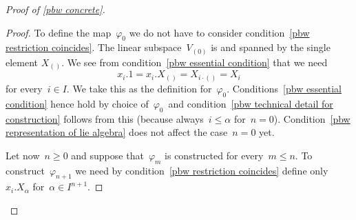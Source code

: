 \begin{proof}[Proof of \cref{pbw concrete}]
\begin{proof}
    To define the map~$\varphi_0$ we do not have to consider condition~\ref*{pbw restriction coincides}.
    The linear subspace~$V_{(0)}$ is {\onedimensional} and spanned by the single element $X_{()}$.
    We see from condition~\ref*{pbw essential condition} that we need
    \[
      x_i.1
      =
      x_i.X_{()}
      =
      X_{i \cdot ()}
      =
      X_i
    \]
    for every~$i \in I$.
    We take this as the definition for~$\varphi_0$.
    Conditions~\ref*{pbw essential condition} hence hold by choice of~$\varphi_0$~and condition~\ref*{pbw technical detail for construction} follows from this (because always~$i \leq \alpha$ for~$n = 0$).
    Condition~\ref*{pbw representation of lie algebra} does not affect the case~$n = 0$ yet.
  
    Let now~$n \geq 0$ and suppose that~$\varphi_m$ is constructed for every~$m \leq n$.
    To construct~$\varphi_{n+1}$ we need by condition~\ref*{pbw restriction coincides} define only~$x_i.X_\alpha$ for~$\alpha \in I^{n+1}$.
    

\end{proof}
\end{proof}
